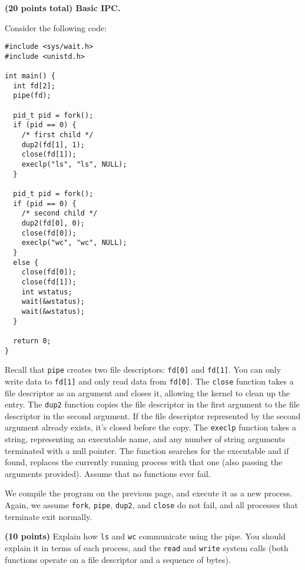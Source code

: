 \documentclass[12pt]{article}
\begin{document}
\newpage

\textbf{(20 points total) Basic IPC.}

\vspace{1em}

Consider the following code:

\begin{lstlisting}[xleftmargin=2em]
#include <sys/wait.h>
#include <unistd.h>

int main() {
  int fd[2];
  pipe(fd);

  pid_t pid = fork();
  if (pid == 0) {
    /* first child */
    dup2(fd[1], 1);
    close(fd[1]);
    execlp("ls", "ls", NULL);
  }

  pid_t pid = fork();
  if (pid == 0) {
    /* second child */
    dup2(fd[0], 0);
    close(fd[0]);
    execlp("wc", "wc", NULL);
  }
  else {
    close(fd[0]);
    close(fd[1]);
    int wstatus;
    wait(&wstatus);
    wait(&wstatus);
  }

  return 0;
}
\end{lstlisting}

Recall that \texttt{pipe} creates two file descriptors: \texttt{fd[0]} and
\texttt{fd[1]}. You can only write data to \texttt{fd[1]} and only read data
from \texttt{fd[0]}.
The \texttt{close} function takes a file descriptor as an argument and closes
it, allowing the kernel to clean up the entry.
The \texttt{dup2} function copies the file descriptor in the first argument
to the file descriptor in the second argument.
If the file descriptor represented by the second
argument already exists, it's closed before the copy.
The \texttt{execlp} function takes a string, representing an executable name,
and any number of string arguments terminated with a null pointer.
The function searches for the executable and if found, replaces the currently
running process with that one (also passing the arguments provided).
Assume that no functions ever fail.

\newpage

We compile the program on the previous page, and execute it as a new process.
Again, we assume \texttt{fork}, \texttt{pipe}, \texttt{dup2}, and \texttt{close}
do not fail, and all processes that terminate exit normally.

\vspace{1em}

\textbf{(10 points)} Explain how \texttt{ls} and \texttt{wc} communicate using
the pipe. You should explain it in terms of each process, and the \texttt{read}
and \texttt{write} system calls (both functions operate on a file descriptor
and a sequence of bytes).
\end{document}
